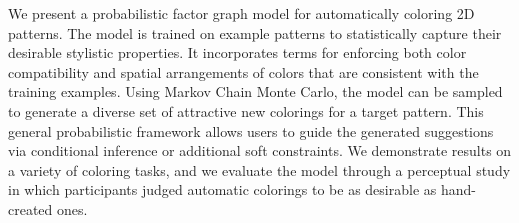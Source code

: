 We present a probabilistic factor graph model for automatically coloring 2D patterns. The model is trained on example patterns to statistically capture their desirable stylistic properties. It incorporates terms for enforcing both color compatibility and spatial arrangements of colors that are consistent with the training examples. Using Markov Chain Monte Carlo, the model can be sampled to generate a diverse set of attractive new colorings for a target pattern. This general probabilistic framework allows users to guide the generated suggestions via conditional inference or additional soft constraints. We demonstrate results on a variety of coloring tasks, and we evaluate the model through a perceptual study in which participants judged automatic colorings to be as desirable as hand-created ones.